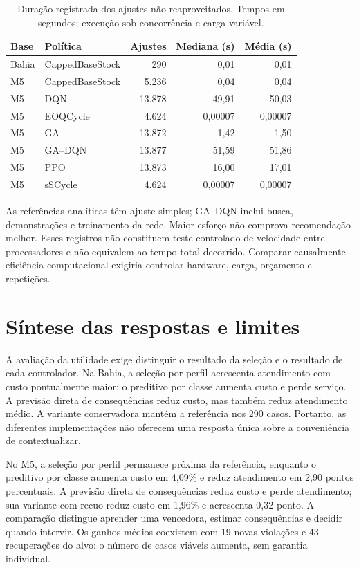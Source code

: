 \begin{table}[htbp]\centering\small
\caption{Duração registrada dos ajustes não reaproveitados. Tempos em segundos; execução sob concorrência e carga variável.}\label{tab:fit_time}
\begin{tabular}{@{}llrrr@{}}\toprule
Base & Política & Ajustes & Mediana (s) & Média (s)\\\midrule
Bahia & CappedBaseStock & 290 & 0,01 & 0,01\\
M5 & CappedBaseStock & 5.236 & 0,04 & 0,04\\
M5 & DQN & 13.878 & 49,91 & 50,03\\
M5 & EOQCycle & 4.624 & 0,00007 & 0,00007\\
M5 & GA & 13.872 & 1,42 & 1,50\\
M5 & GA--DQN & 13.877 & 51,59 & 51,86\\
M5 & PPO & 13.873 & 16,00 & 17,01\\
M5 & sSCycle & 4.624 & 0,00007 & 0,00007\\
\bottomrule\end{tabular}\end{table}

As referências analíticas têm ajuste simples; GA--DQN inclui busca, demonstrações e treinamento da rede. Maior esforço não comprova recomendação melhor. Esses registros não constituem teste controlado de velocidade entre processadores e não equivalem ao tempo total decorrido. Comparar causalmente eficiência computacional exigiria controlar hardware, carga, orçamento e repetições.

\section{Síntese das respostas e limites}
\label{sec:threats}\label{sec:resultados_m5}
A avaliação da utilidade exige distinguir o resultado da seleção e o resultado de cada controlador. Na Bahia, a seleção por perfil acrescenta atendimento com custo pontualmente maior; o preditivo por classe aumenta custo e perde serviço. A previsão direta de consequências reduz custo, mas também reduz atendimento médio. A variante conservadora mantém a referência nos 290 casos. Portanto, as diferentes implementações não oferecem uma resposta única sobre a conveniência de contextualizar.

No M5, a seleção por perfil permanece próxima da referência, enquanto o preditivo por classe aumenta custo em 4,09\% e reduz atendimento em 2,90 pontos percentuais. A previsão direta de consequências reduz custo e perde atendimento; sua variante com recuo reduz custo em 1,96\% e acrescenta 0,32 ponto. A comparação distingue aprender uma vencedora, estimar consequências e decidir quando intervir. Os ganhos médios coexistem com 19 novas violações e 43 recuperações do alvo: o número de casos viáveis aumenta, sem garantia individual.


